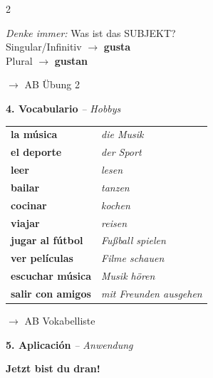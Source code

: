 \documentclass[10pt, a4paper]{article}
\newcommand{\seriftext}[1]{{\fontfamily{ppl}\selectfont #1}}
\newcommand{\es}[1]{\seriftext{\textbf{#1}}}
\newcommand{\de}[1]{\textit{\textcolor{akzent}{#1}}}
\newcommand{\abmark}[1]{{\footnotesize\textcolor{spanisch}{$\rightarrow$ AB #1}}}
\newcommand{\abschnitt}[2]{\noindent\textbf{\large #1. #2}}
\begin{document}
\begin{multicols}{2}
\vspace{6pt}

\begin{tippbox}
{\footnotesize\textit{Denke immer:} Was ist das SUBJEKT?\\
Singular/Infinitiv $\rightarrow$ \es{gusta}\\
Plural $\rightarrow$ \es{gustan}}
\end{tippbox}

\vspace{4pt}

\abmark{Übung 2}

\vspace{8pt}

\abschnitt{4}{Vocabulario} \de{-- Hobbys}

\vspace{4pt}

{\small
\begin{tabular}{@{}ll@{}}
\es{la música} & \de{die Musik} \\
\es{el deporte} & \de{der Sport} \\
\es{leer} & \de{lesen} \\
\es{bailar} & \de{tanzen} \\
\es{cocinar} & \de{kochen} \\
\es{viajar} & \de{reisen} \\
\es{jugar al fútbol} & \de{Fußball spielen} \\
\es{ver películas} & \de{Filme schauen} \\
\es{escuchar música} & \de{Musik hören} \\
\es{salir con amigos} & \de{mit Freunden ausgehen} \\
\end{tabular}}

\vspace{6pt}

\abmark{Vokabelliste}

\vspace{8pt}

\abschnitt{5}{Aplicación} \de{-- Anwendung}

\vspace{4pt}

\textbf{Jetzt bist du dran!}


\end{multicols}
\end{document}
